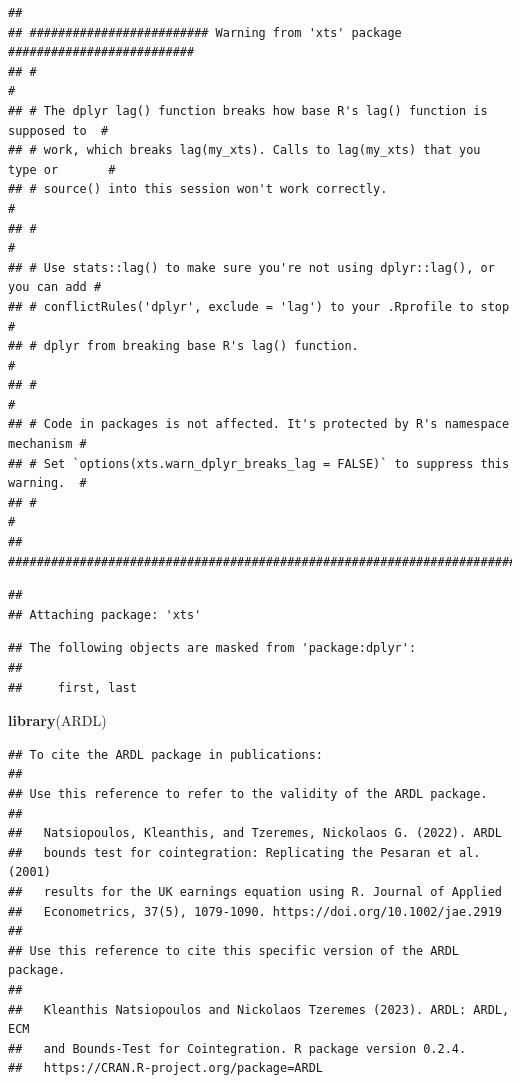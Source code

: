 \documentclass[
]{book}
\newenvironment{Shaded}{\begin{snugshade}}{\end{snugshade}}
\newcommand{\FunctionTok}[1]{\textcolor[rgb]{0.13,0.29,0.53}{\textbf{#1}}}
\newcommand{\NormalTok}[1]{#1}
\begin{document}
\begin{verbatim}
## 
## ######################### Warning from 'xts' package ##########################
## #                                                                             #
## # The dplyr lag() function breaks how base R's lag() function is supposed to  #
## # work, which breaks lag(my_xts). Calls to lag(my_xts) that you type or       #
## # source() into this session won't work correctly.                            #
## #                                                                             #
## # Use stats::lag() to make sure you're not using dplyr::lag(), or you can add #
## # conflictRules('dplyr', exclude = 'lag') to your .Rprofile to stop           #
## # dplyr from breaking base R's lag() function.                                #
## #                                                                             #
## # Code in packages is not affected. It's protected by R's namespace mechanism #
## # Set `options(xts.warn_dplyr_breaks_lag = FALSE)` to suppress this warning.  #
## #                                                                             #
## ###############################################################################
\end{verbatim}

\begin{verbatim}
## 
## Attaching package: 'xts'
\end{verbatim}

\begin{verbatim}
## The following objects are masked from 'package:dplyr':
## 
##     first, last
\end{verbatim}

\begin{Shaded}
\begin{Highlighting}[]
\FunctionTok{library}\NormalTok{(ARDL)}
\end{Highlighting}
\end{Shaded}

\begin{verbatim}
## To cite the ARDL package in publications:
## 
## Use this reference to refer to the validity of the ARDL package.
## 
##   Natsiopoulos, Kleanthis, and Tzeremes, Nickolaos G. (2022). ARDL
##   bounds test for cointegration: Replicating the Pesaran et al. (2001)
##   results for the UK earnings equation using R. Journal of Applied
##   Econometrics, 37(5), 1079-1090. https://doi.org/10.1002/jae.2919
## 
## Use this reference to cite this specific version of the ARDL package.
## 
##   Kleanthis Natsiopoulos and Nickolaos Tzeremes (2023). ARDL: ARDL, ECM
##   and Bounds-Test for Cointegration. R package version 0.2.4.
##   https://CRAN.R-project.org/package=ARDL
\end{verbatim}
\end{document}
